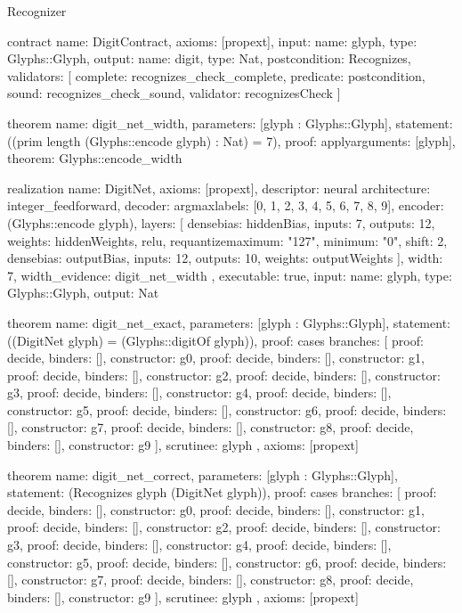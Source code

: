 \begin{lexlean}{Recognizer}
\begin{semanticmodule}
contract{
  name: DigitContract,
  axioms: [propext],
  input: {name: glyph, type: Glyphs::Glyph},
  output: {name: digit, type: Nat},
  postcondition: Recognizes,
  validators: [
    {
      complete: recognizes_check_complete,
      predicate: postcondition,
      sound: recognizes_check_sound,
      validator: recognizesCheck
    }
  ]
}

theorem{
  name: digit_net_width,
  parameters: [glyph : Glyphs::Glyph],
  statement: ((prim length (Glyphs::encode glyph) : Nat) = 7),
  proof: apply{arguments: [glyph], theorem: Glyphs::encode_width}
}

realization{
  name: DigitNet,
  axioms: [propext],
  descriptor: neural{
    architecture: integer_feedforward,
    decoder: argmax{labels: [0, 1, 2, 3, 4, 5, 6, 7, 8, 9]},
    encoder: (Glyphs::encode glyph),
    layers: [
      dense{bias: hiddenBias, inputs: 7, outputs: 12, weights: hiddenWeights},
      relu{},
      requantize{maximum: "127", minimum: "0", shift: 2},
      dense{bias: outputBias, inputs: 12, outputs: 10, weights: outputWeights}
    ],
    width: 7,
    width_evidence: digit_net_width
  },
  executable: true,
  input: {name: glyph, type: Glyphs::Glyph},
  output: Nat
}

theorem{
  name: digit_net_exact,
  parameters: [glyph : Glyphs::Glyph],
  statement: ((DigitNet glyph) = (Glyphs::digitOf glyph)),
  proof: cases{
    branches: [
      {proof: decide{}, binders: [], constructor: g0},
      {proof: decide{}, binders: [], constructor: g1},
      {proof: decide{}, binders: [], constructor: g2},
      {proof: decide{}, binders: [], constructor: g3},
      {proof: decide{}, binders: [], constructor: g4},
      {proof: decide{}, binders: [], constructor: g5},
      {proof: decide{}, binders: [], constructor: g6},
      {proof: decide{}, binders: [], constructor: g7},
      {proof: decide{}, binders: [], constructor: g8},
      {proof: decide{}, binders: [], constructor: g9}
    ],
    scrutinee: glyph
  },
  axioms: [propext]
}

theorem{
  name: digit_net_correct,
  parameters: [glyph : Glyphs::Glyph],
  statement: (Recognizes glyph (DigitNet glyph)),
  proof: cases{
    branches: [
      {proof: decide{}, binders: [], constructor: g0},
      {proof: decide{}, binders: [], constructor: g1},
      {proof: decide{}, binders: [], constructor: g2},
      {proof: decide{}, binders: [], constructor: g3},
      {proof: decide{}, binders: [], constructor: g4},
      {proof: decide{}, binders: [], constructor: g5},
      {proof: decide{}, binders: [], constructor: g6},
      {proof: decide{}, binders: [], constructor: g7},
      {proof: decide{}, binders: [], constructor: g8},
      {proof: decide{}, binders: [], constructor: g9}
    ],
    scrutinee: glyph
  },
  axioms: [propext]
}


\end{semanticmodule}
\end{lexlean}
